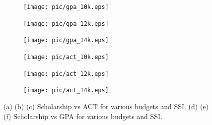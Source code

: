 \documentclass[12pt,english]{report}
\begin{document}
\begin{figure}
\centering
\begin{subfigure}{0.33\textwidth}
\texttt{[image: pic/gpa\_10k.eps]}
\caption{} \label{allocation_results_a}
\end{subfigure}\hspace*{\fill}
\begin{subfigure}{0.33\textwidth }
\texttt{[image: pic/gpa\_12k.eps]}
\caption{} %
\end{subfigure}\hspace*{\fill}
\begin{subfigure}{0.33\textwidth}
\texttt{[image: pic/gpa\_14k.eps]}
\caption{} %
\end{subfigure}\hspace*{\fill}

\medskip
\begin{subfigure}{0.33\textwidth}
\texttt{[image: pic/act\_10k.eps]}
\caption{} %
\end{subfigure}\hspace*{\fill}
\begin{subfigure}{0.33\textwidth }
\texttt{[image: pic/act\_12k.eps]}
\caption{} %
\end{subfigure}\hspace*{\fill}
\begin{subfigure}{0.33\textwidth}
\texttt{[image: pic/act\_14k.eps]}
\caption{} %
\end{subfigure}\hspace*{\fill}
\caption{
(a) (b) (c) Scholarship vs ACT for various budgets and SSI.
(d) (e) (f) Scholarship vs GPA for various budgets and SSI.
}
\label{allocation_results} 

\end{figure}






\end{document}
